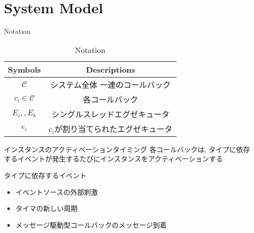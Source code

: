 \section{System Model}
\label{sec: system_model}

\begin{frame}{Notation}
    \begin{table}[h]
        \centering\begin{tabular}{|c|c|}\hline
            \textbf{Symbols}      & \textbf{Descriptions}               \\\hline
            $\mathcal{C}$         & システム全体 一連のコールバック    \\\hline
            $c_i \in \mathcal{C}$ & 各コールバック                      \\\hline
            $E_i, , E_k$       & シングルスレッドエグゼキュータ      \\\hline
            $e_i$                 & $c_i$が割り当てられたエグゼキュータ \\\hline
        \end{tabular}
        \caption{Notation}
        \label{tab: notation}
    \end{table}
\end{frame}

\begin{frame}{インスタンスのアクティベーションタイミング}
    各コールバックは, タイプに依存するイベントが発生するたびにインスタンスをアクティベーションする

    \begin{block}{タイプに依存するイベント}
        \begin{itemize}
            \item イベントソースの外部刺激
            \item タイマの新しい周期
            \item メッセージ駆動型コールバックのメッセージ到着
        \end{itemize}
    \end{block}
\end{frame}

